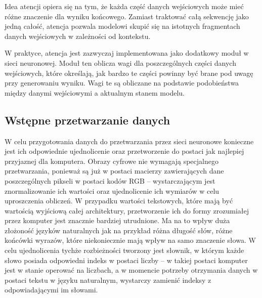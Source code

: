 Idea atencji opiera się na tym, że każda część danych wejściowych może mieć różne znaczenie dla wyniku końcowego. Zamiast traktować całą sekwencję jako jedną całość, atencja pozwala modelowi skupić się na istotnych fragmentach danych wejściowych w zależności od kontekstu.

W praktyce, atencja jest zazwyczaj implementowana jako dodatkowy moduł w sieci neuronowej. Moduł ten oblicza wagi dla poszczególnych części danych wejściowych, które określają, jak bardzo te części powinny być brane pod uwagę przy generowaniu wyniku. Wagi te są obliczane na podstawie podobieństwa między danymi wejściowymi a aktualnym stanem modelu.
\subsection{Wstępne przetwarzanie danych}
W celu przygotowania danych do przetwarzania przez sieci neuronowe konieczne jest ich odpowiednie ujednolicenie oraz przetworzenie do postaci jak najlepiej przyjaznej dla komputera. Obrazy cyfrowe nie wymagają specjalnego przetwarzania, ponieważ są już w postaci macierzy zawierających dane poszczególnych pikseli w postaci kodów RGB -- wystarczającym jest znormalizowanie ich wartości oraz ujednolicenie ich wymiarów w celu uproszczenia obliczeń. W przypadku wartości tekstowych, które mają być wartością wyjściową całej architektury, przetworzenie ich do formy zrozumiałej przez komputer jest znacznie bardziej utrudnione. Ma na to wpływ duża złożoność języków naturalnych jak na przykład różna długość słów, różne końcówki wyrazów, które niekoniecznie mają wpływ na samo znaczenie słowa. W celu ujednolicenia tychże rozbieżności tworzony jest słownik, w którym każde słowo posiada odpowiedni indeks w postaci liczby -- w takiej postaci komputer jest w stanie operować na liczbach, a w momencie potrzeby otrzymania danych w postaci tekstu w języku naturalnym, wystarczy zamienić indeksy z odpowiadającymi im słowami.
